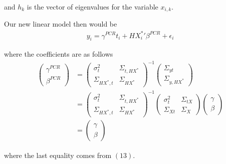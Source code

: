 \documentclass[12pt]{article}
\begin{document}
and $h_k$ is the vector of eigenvalues for the variable $x_{i,k}$.

Our new linear model then would be
\begin{align}
    y_i = \gamma^{PCR} t_i + H{X^*_i}'\beta^{PCR} + \epsilon_i
\end{align}

where the coefficients are as follows
\begin{align}
    \left(\begin{array}{l}
{\gamma}^{PCR} \\
{\beta}^{PCR}
\end{array}\right)&=\left(\begin{array}{cc}
{\sigma}^2_{t} & \Sigma_{t,HX^*} \\
\Sigma_{HX^*,t} & {\Sigma}_{HX^*}
\end{array}\right)^{-1}\left(\begin{array}{c}
\Sigma_{yt} \\
\Sigma_{y,HX^*}
\end{array}\right)\\
&=\left(\begin{array}{cc}
{\sigma}^2_{t} & \Sigma_{t,HX^*} \\
\Sigma_{HX^*,t} & {\Sigma}_{HX^*}
\end{array}\right)^{-1}\left(\begin{array}{cc}
{\sigma}^2_{t} & \Sigma_{tX} \\
\Sigma_{Xt} & {\Sigma}_{X}
\end{array}\right)\left(\begin{array}{l}
{\gamma} \\
{\beta}
\end{array}\right)\\
&=\left(\begin{array}{l}
{\gamma} \\
{\beta}
\end{array}\right)
\end{align}

where the last equality comes from $(13)$.
\end{document}
